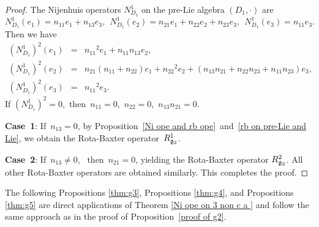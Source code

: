 \documentclass[12pt, reqno]{amsart}
\theoremstyle{plain}
\begin{document}
\begin{proof}
The Nijenhuis operators $N_{D_1}^1$ on the pre-Lie algebra $(D_1,\cdot)$ are
  $$N_{D_{1}}^1(e_1)=n_{11}e_1+  n_{13}e_3 ,~~ N_{D_{1}}^1(e_2)= n_{21}e_1+ n_{22}e_2+ n_{23}e_3 ,~~ N_{D_{1}}^1(e_3)=  n_{11}e_3.$$
 Then we have
  \begin{eqnarray*}
    ({N_{D_1}^1})^2(e_1) &=&{n_{11}}^2e_1+n_{11}n_{13}e_2,\\
    ({N_{D_1}^1})^2(e_2)&=& n_{21}(n_{11}+n_{22})e_1+ {n_{22}}^2e_2+(n_{13}n_{21}+n_{22}n_{23}+n_{11}n_{23})e_3, \\
    ({N_{D_1}^1})^2(e_3) &=& {n_{11}}^2e_3.
  \end{eqnarray*}
   If  $({N_{D_1}^1})^2=0$,~then~$n_{11}=0$,~$n_{22}=0$,~$n_{13}n_{21}=0$.

 \textbf{Case~1}: If~$n_{13}=0$,
by Proposition~\ref{Ni ope and rb ope}~and~\ref{rb on pre-Lie and Lie},  we obtain the Rota-Baxter operator~$R_{\frak g_2}^1$.

\textbf{Case~2}: If~$n_{13}\neq0$,
~then~$n_{21}=0$, 
 yielding the Rota-Baxter operator $R_{\frak g_2}^2$.
All other Rota-Baxter operators are obtained similarly. This completes the proof.
\end{proof}

The following Propositions \ref{thm:g3}, Propositions \ref{thm:g4}, and Propositions \ref{thm:g5} are direct applications of Theorem \ref{Ni ope on 3 non c a } and follow the same approach as in the proof of Proposition~\ref{proof of g2}.
\end{document}
